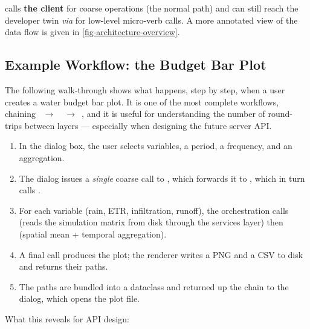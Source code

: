  calls \textbf{the client} for coarse operations (the normal path) and can still reach the developer twin \textit{via}  for low-level micro-verb calls. A more annotated view of the data flow is given in \cref{fig-architecture-overview}.

\subsection{Example Workflow: the Budget Bar Plot}
\label{sec-example-workflow}

The following walk-through shows what happens, step by step, when a user creates a water budget bar plot. It is one of the most complete workflows, chaining ~$\rightarrow$~~$\rightarrow$~, and it is useful for understanding the number of round-trips between layers --- especially when designing the future server API.

\begin{enumerate}
    \item In the  dialog box, the user selects variables, a period, a frequency, and an aggregation.
    \item The dialog issues a \emph{single} coarse call to , which forwards it to , which in turn calls .
    \item For each variable (rain, ETR, infiltration, runoff), the orchestration calls  (reads the simulation matrix from disk through the services layer) then  (spatial mean + temporal aggregation).
    \item A final  call produces the plot; the renderer writes a PNG and a CSV to disk and returns their paths.
    \item The paths are bundled into a  dataclass and returned up the chain to the dialog, which opens the plot file.
\end{enumerate}

What this reveals for API design:

